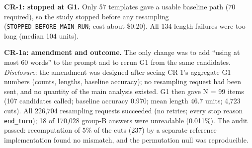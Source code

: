 \documentclass[
  10pt,
  a4paper,
]{article}
\begin{document}
\textbf{CR-1: stopped at G1.} Only 57 templates gave a usable baseline path (70 required), so the study stopped before any resampling (\texttt{STOPPED\_\allowbreak{}BEFORE\_\allowbreak{}MAIN\_\allowbreak{}RUN}; cost about \$0.20). All 134
length failures were too long (median 104 units).

\textbf{CR-1a: amendment and outcome.} The only change was to add ``using at most 60 words'' to the prompt and to rerun G1 from the same candidates. \emph{Disclosure}: the amendment was designed after
seeing CR-1's aggregate G1 numbers (counts, lengths, baseline accuracy); no resampling request had been sent, and no quantity of the main analysis existed. G1 then gave N = 99 items (107 candidates
called; baseline accuracy 0.970; mean length 46.7 units; 4,723 cuts). All 226,704 resampling requests succeeded (no retries; every stop reason \texttt{end\_\allowbreak{}turn}); 18 of 170,028 group-B answers were
unreadable (0.011\%). The audit passed: recomputation of 5\% of the cuts (237) by a separate reference implementation found no mismatch, and the permutation null was reproducible.
\end{document}
